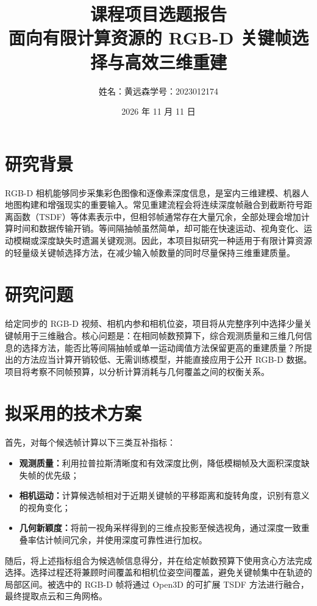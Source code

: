 \documentclass[10pt,a4paper]{ctexart}
\title{课程项目选题报告\\[0.35em]\normalsize 面向有限计算资源的 RGB-D 关键帧选择与高效三维重建}
\author{姓名：黄远森\quad 学号：2023012174}
\date{2026 年 11 月 11 日}
\begin{document}
\pagestyle{plain}
\maketitle
\vspace{-3.0em}

\section{研究背景}
RGB-D 相机能够同步采集彩色图像和逐像素深度信息，是室内三维建模、机器人地图构建和增强现实的重要输入。常见重建流程会将连续深度帧融合到截断符号距离函数（TSDF）等体素表示中，但相邻帧通常存在大量冗余，全部处理会增加计算时间和数据传输开销。等间隔抽帧虽然简单，却可能在快速运动、视角变化、运动模糊或深度缺失时遗漏关键观测。因此，本项目拟研究一种适用于有限计算资源的轻量级关键帧选择方法，在减少输入帧数量的同时尽量保持三维重建质量。

\section{研究问题}
给定同步的 RGB-D 视频、相机内参和相机位姿，项目将从完整序列中选择少量关键帧用于三维融合。核心问题是：在相同帧数预算下，综合观测质量和三维几何信息的选择方法，能否比等间隔抽帧或单一运动阈值方法保留更高的重建质量？所提出的方法应当计算开销较低、无需训练模型，并能直接应用于公开 RGB-D 数据。项目将考察不同帧预算，以分析计算消耗与几何覆盖之间的权衡关系。

\section{拟采用的技术方案}
首先，对每个候选帧计算以下三类互补指标：
\begin{itemize}
  \item \textbf{观测质量：}利用拉普拉斯清晰度和有效深度比例，降低模糊帧及大面积深度缺失帧的优先级；
  \item \textbf{相机运动：}计算候选帧相对于近期关键帧的平移距离和旋转角度，识别有意义的视角变化；
  \item \textbf{几何新颖度：}将前一视角采样得到的三维点投影至候选视角，通过深度一致重叠率估计帧间冗余，并使用深度可靠性进行加权。
\end{itemize}

随后，将上述指标组合为候选帧信息得分，并在给定帧数预算下使用贪心方法完成选择。选择过程还将兼顾时间覆盖和相机位姿空间覆盖，避免关键帧集中在轨迹的局部区间。被选中的 RGB-D 帧将通过 Open3D 的可扩展 TSDF 方法进行融合，最终提取点云和三角网格。
\end{document}
